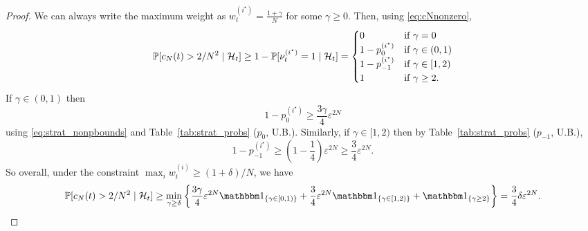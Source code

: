 \begin{proof}
We can always write the maximum weight as $w_t^{(i^\star)} = \frac{1+\gamma}{N}$ for some $\gamma \geq 0$. Then, using \eqref{eq:cNnonzero},
\begin{equation*}
\mathbb{P}[ c_N(t) > 2/N^2 \mid \mathcal{H}_t ]
\geq 1- \mathbb{P}[ \nu_t^{(i^\star)} =1 \mid \mathcal{H}_t ]
= \begin{cases}
    0 & \text{if } \gamma = 0 \\
    1 - p_0^{(i^\star)} & \text{if } \gamma \in (0,1) \\
    1 - p_{-1}^{(i^\star)} & \text{if } \gamma \in [1,2) \\
    1 & \text{if } \gamma \geq 2 .
\end{cases}
\end{equation*}
If $\gamma \in (0,1)$ then
\begin{equation*}
1 - p_0^{(i^\star)}
\geq \frac{3\gamma }{4} \varepsilon^{2N}
\end{equation*}
using \eqref{eq:strat_nonpbounds} and %
Table~\ref{tab:strat_probs} ($p_0$, U.B.).
Similarly, if $\gamma \in [1,2)$ then by Table~\ref{tab:strat_probs} ($p_{-1}$, U.B.),
\begin{equation*}
1 - p_{-1}^{(i^\star)}
\geq \left( 1- \frac{1}{4} \right)
        \varepsilon^{2N} 
\geq \frac{3}{4} \varepsilon^{2N} .
\end{equation*}
So overall, under the constraint $\max_i w_t^{(i)} \geq (1+\delta)/N$, we have
\begin{equation*}
\Prob[ c_N(t) > 2/N^2 \mid \mathcal{H}_t ]
\geq \min_{\gamma \geq \delta} 
        \left\{ \frac{3\gamma }{4} \varepsilon^{2N} \I{\gamma \in [0,1)}
        + \frac{3 }{4} \varepsilon^{2N} \I{\gamma \in [1,2)}
        + \I{\gamma \geq 2} \right\}
= \frac{3}{4} \delta \varepsilon^{2N} .
\end{equation*}


\end{proof}
